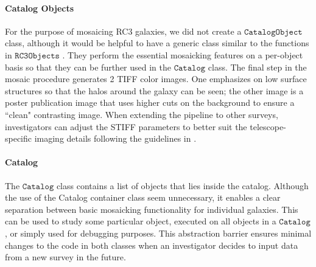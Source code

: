 \documentclass[5p]{elsarticle}
\begin{document}
	\paragraph{Catalog Objects}
	For the purpose of mosaicing RC3 galaxies, we did not create a $\texttt{CatalogObject}$ class, although it would be helpful to have a generic class similar to the functions in $\texttt{RC3Objects}$	. They perform the essential mosaicking features on a per-object basis so that they can be further used in the $\texttt{Catalog}$ class. The final step in the mosaic procedure generates 2 TIFF color images. One emphasizes on low surface structures  so that the halos around the galaxy can be seen; the other image is a poster\/ publication image that uses higher cuts on the background to ensure a ``clean" contrasting image. When extending the pipeline to other surveys, investigators can adjust the STIFF parameters to better suit the telescope-specific imaging details following the guidelines in \citet{stiff}.
	\paragraph{Catalog}
	The $\texttt{Catalog}$ class contains a list of objects that lies inside the catalog. Although the use of the Catalog container class seem unnecessary, it enables a clear separation between basic mosaicking functionality for individual galaxies. This can be used to study some particular object, executed on all objects in a $\texttt{Catalog}$, or simply used for debugging purposes. This abstraction barrier ensures minimal changes to the code in both classes when an investigator decides to input data from a new survey in the future.
\end{document}
